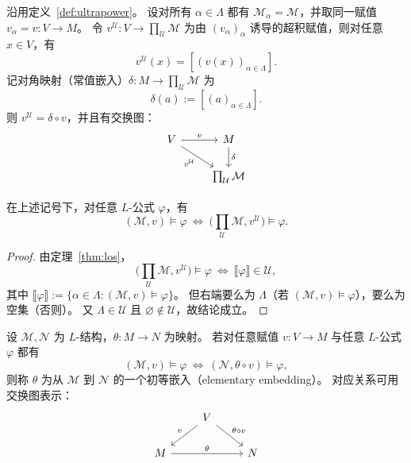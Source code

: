 \documentclass[lang=cn,a4paper,newtx,section]{elegantbook}
\begin{document}
\begin{definition}
\label{ultrapower-constant-assignment}
沿用定义~\ref{def:ultrapower}。
设对所有 $\alpha\in\Lambda$ 都有 $\mathcal M_{\alpha}=\mathcal M$，并取同一赋值 $v_{\alpha}=v:V\to M$。
令 $v^{\mathcal U}:V\to \prod_{\mathcal U}\mathcal M$ 为由 $(v_{\alpha})_{\alpha}$ 诱导的超积赋值，则对任意 $x\in V$，有
\[
  v^{\mathcal U}(x)=[(v(x))_{\alpha\in\Lambda}].
\]
记对角映射（常值嵌入）$\delta:M\to\prod_{\mathcal U}\mathcal M$ 为
\[
  \delta(a):=[(a)_{\alpha\in\Lambda}].
\]
则 $v^{\mathcal U}=\delta\circ v$，并且有交换图：
\[
\begin{tikzcd}
V \arrow[r, "v"] \arrow[dr, "v^{\mathcal U}"'] & M \arrow[d, "\delta"] \\
& \prod_{\mathcal U}\mathcal M
\end{tikzcd}
\]
\end{definition}

\begin{proposition}
\label{ultrapower-preserve-satisfaction}
在上述记号下，对任意 $L$-公式 $\varphi$，有
\[
  (\mathcal M,v)\models\varphi \ \Longleftrightarrow\ \bigl(\prod_{\mathcal U}\mathcal M, v^{\mathcal U}\bigr)\models\varphi.
\]
\end{proposition}

\begin{proof}
由定理~\ref{thm:los}，
\[
  \bigl(\prod_{\mathcal U}\mathcal M, v^{\mathcal U}\bigr)\models\varphi
  \ \Longleftrightarrow\ \llbracket\varphi\rrbracket\in\mathcal U,
\]
其中 $\llbracket\varphi\rrbracket:=\{\alpha\in\Lambda:(\mathcal M,v)\models\varphi\}$。
但右端要么为 $\Lambda$（若 $(\mathcal M,v)\models\varphi$），要么为空集（否则）。
又 $\Lambda\in\mathcal U$ 且 $\varnothing\notin\mathcal U$，故结论成立。
\end{proof}

\begin{definition}[初等嵌入]
\label{elementary-embedding}
设 $\mathcal M,\mathcal N$ 为 $L$-结构，$\theta:M\to N$ 为映射。
若对任意赋值 $v:V\to M$ 与任意 $L$-公式 $\varphi$ 都有
\[
  (\mathcal M,v)\models\varphi \ \Longleftrightarrow\ (\mathcal N,\theta\circ v)\models\varphi,
\]
则称 $\theta$ 为从 $\mathcal M$ 到 $\mathcal N$ 的一个初等嵌入（elementary embedding）。
对应关系可用交换图表示：
\[
\begin{tikzcd}
& V \arrow[dl, "v"'] \arrow[dr, "\theta\circ v"] & \\
M \arrow[rr, "\theta"] & & N
\end{tikzcd}
\]
\end{definition}
\end{document}
